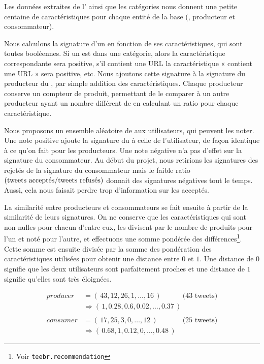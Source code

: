 Les données extraites de l’\api{} ainsi que les catégories nous donnent une
petite centaine de caractéristiques pour chaque entité de la base (\tweet{},
producteur et consommateur).

Nous calculons la signature d’un \tweet{} en fonction de ses caractéristiques,
qui sont toutes booléennes. Si un \tweet{} est dans une catégorie, alors la
caractéristique correspondante sera positive, s’il contient une URL la
caractéristique « contient une URL » sera positive, etc. Nous ajoutons cette
signature à la signature du producteur du \tweet{}, par simple addition des
caractéristiques. Chaque producteur conserve un compteur de \tweets{} produit,
permettant de le comparer à un autre producteur ayant un nombre différent de
\tweets{} en calculant un ratio pour chaque caractéristique.

Nous proposons un ensemble aléatoire de \tweets{} aux utilisateurs, qui peuvent
les noter. Une note positive ajoute la signature du \tweet{} à celle de
l’utilisateur, de façon identique à ce qu’on fait pour les producteurs. Une
note négative n’a pas d’effet sur la signature du consommateur. Au début du
projet, nous retirions les signatures des \tweets{} rejetés de la signature du
consommateur mais le faible ratio
$(\text{tweets{} acceptés} / \text{tweets{} refusés})$ donnait des signatures
négatives tout le temps. Aussi, cela nous faisait perdre trop d’information sur
les \tweets{} acceptés.

La similarité entre producteurs et consommateurs se fait ensuite à partir de la
similarité de leurs signatures. On ne conserve que les caractéristiques qui
sont non-nulles pour chacun d’entre eux, les divisent par le nombre de
\tweets{} produits pour l’un et noté pour l’autre, et effectuons une somme
pondérée des différences\footnote{Voir \verb|teebr.recommendation|}. Cette
somme est ensuite divisée par la somme des pondération des caractéristiques
utilisées pour obtenir une distance entre $0$ et $1$. Une distance de $0$
signifie que les deux utilisateurs sont parfaitement proches et une distance
de $1$ signifie qu’elles sont très éloignées.

\begin{equation}
  \label{eq:sig_proc_cons}
  \begin{split}
    producer &= (\,43, 12, 26, 1, \ldots, 16\,)\quad\qquad\text{(43 tweets)} \\
             &\Rightarrow (\,1, 0.28, 0.6, 0.02, \ldots, 0.37\,) \\
    \\
    consumer &= (\,17, 25, 3, 0, \ldots, 12\,)\,\,\,\quad\qquad\text{(25 tweets)} \\
             &\Rightarrow (\,0.68, 1, 0.12, 0, \ldots, 0.48\,)
  \end{split}
\end{equation}


